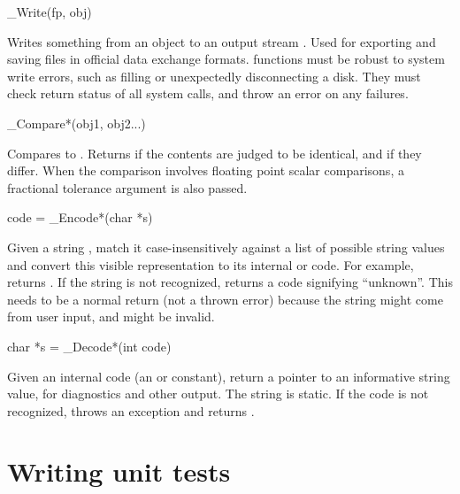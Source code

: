 \begin{sreapi}
\hypertarget{ifc:Write}
{\item[\_Write(fp, obj)]}
Writes something from an object to an output stream . Used
for exporting and saving files in official data exchange formats.
 functions must be robust to system write errors,
such as filling or unexpectedly disconnecting a disk. They must check
return status of all system calls, and throw an 
error on any failures.


\hypertarget{ifc:Compare}
{\item[\_Compare*(obj1, obj2...)]}

Compares  to . Returns  if the
contents are judged to be identical, and  if they
differ. When the comparison involves floating point scalar
comparisons, a fractional tolerance argument  is also
passed. 

\hypertarget{ifc:Encode}
{\item[code = \_Encode*(char *s)]}

Given a string , match it case-insensitively against a list
of possible string values and convert this visible representation to
its internal  or  code. For example,
 returns
. If the string is not recognized, returns a
code signifying ``unknown''. This needs to be a normal return (not a
thrown error) because the string might come from user input, and might
be invalid.


\hypertarget{ifc:Decode}
{\item[char *s = \_Decode*(int code)]}

Given an internal code (an  or  constant),
return a pointer to an informative string value, for diagnostics and
other output. The string is static. If the code is not recognized,
throws an  exception and returns .

\end{sreapi}






\section{Writing unit tests}

